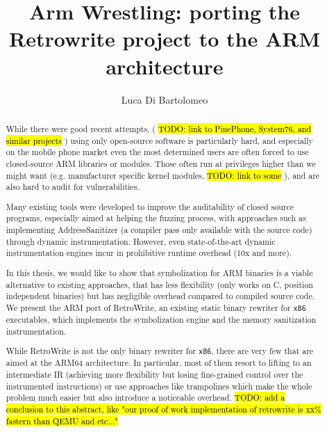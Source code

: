\documentclass[a4paper,11pt,oneside]{report}
\title{Arm Wrestling: porting the Retrowrite project to the ARM architecture}
\author{Luca Di Bartolomeo} \adviser{Prof. Mathias Payer (EPFL)}
\newcommand{\sysname}{RetroWrite\xspace}
\newcommand{\todo}[1]{%
	\begingroup 
	\sethlcolor{cyan}%
	\hl{TODO: #1}%
	\endgroup
}
\begin{document}
\maketitle
\makededication
\makeacks


\begin{abstract}

	While there were good recent attempts, (\todo{link to PinePhone, System76,
	and similar projects}) using only open-source software is particularly
	hard, and especially on the mobile phone market even the most determined
	users are often forced to use closed-source ARM libraries or modules.  
	Those often run at privileges higher than we might want (e.g. manufacturer
	specific kernel modules, \todo{link to some}), and are also hard to audit
	for vulnerabilities. 

	Many existing tools were developed to improve the auditability of closed
	source programs, especially aimed at helping the fuzzing process, with
	approaches such as implementing AddressSanitizer (a compiler pass only
	available with the source code) through dynamic instrumentation. However,  
	even state-of-the-art dynamic instrumentation engines incur in prohibitive 
	runtime overhead (10x and more). 

	In this thesis, we would like to show that symbolization for ARM binaries 
	is a viable alternative to existing approaches, that has less flexibility 
	(only works on C, position independent binaries) but has
	negligible overhead compared to compiled source code. We present the ARM
	port of \sysname, an existing static binary rewriter for \texttt{x86}
	executables, which implements the symbolization engine and the memory
	sanitization instrumentation. 

	While \sysname is not the only binary rewriter for \texttt{x86}, there are 
	very few that are aimed at the ARM64 architecture. In particular, most of 
	them resort to lifting to an intermediate IR (achieving more flexibility 
	but losing fine-grained control over the instrumented instructions) or use 
	approaches like trampolines which make the whole problem much easier but 
	also introduce a noticeable overhead.
	\todo{add a conclusion to this abstract, like "our proof of work 
	implementation of retrowrite is xx\% fastern than QEMU and etc..."}


\end{abstract}


\maketoc

\end{document}
